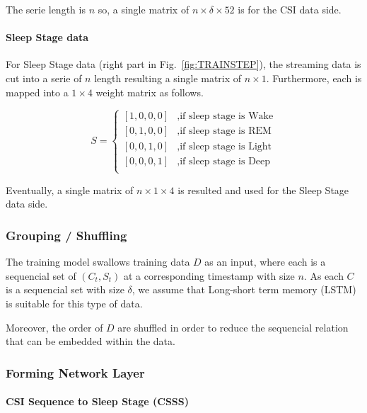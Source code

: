 \documentclass[10pt,letterpaper]{article}
\begin{document}
	The serie length is $n$ so, a single matrix of  $n \times \delta \times 52$ is for the CSI data side.
	
	\paragraph{Sleep Stage data}
	For Sleep Stage data (right part in Fig.~\ref{fig:TRAINSTEP}), the streaming data is cut into a serie of  $n$ length resulting a single matrix of  $n \times 1$. Furthermore, each is mapped into a $1 \times 4$ weight matrix as follows.
	
	\begin{equation}
		S = \begin{cases}
			[1,0,0,0] &\text{,if sleep stage is Wake}\\
			[0,1,0,0] &\text{,if sleep stage is REM}\\
			[0,0,1,0] &\text{,if sleep stage is Light}\\
			[0,0,0,1] &\text{,if sleep stage is Deep}\\
		\end{cases}
		\label{eq:SSparser}
	\end{equation}	
	
	Eventually, a single matrix of  $n \times 1 \times 4$ is resulted and used for the Sleep Stage data side.
	
	\subsubsection*{Grouping / Shuffling}
	
	
	The training model swallows training data $D$ as an input, where each is a sequencial set of $(C_t,S_t)$ at a corresponding timestamp with size $n$.	
	As each $C$ is a sequencial set with size $\delta$, we assume that Long-short term memory (LSTM) \cite{hochreiterS} is suitable for this type of data.
	
	Moreover, the order of $D$ are shuffled in order to reduce the sequencial relation that can be embedded within the data.
	
	\subsubsection*{Forming Network Layer}
	
	\paragraph*{CSI Sequence to Sleep Stage (CSSS)}
	
\end{document}
